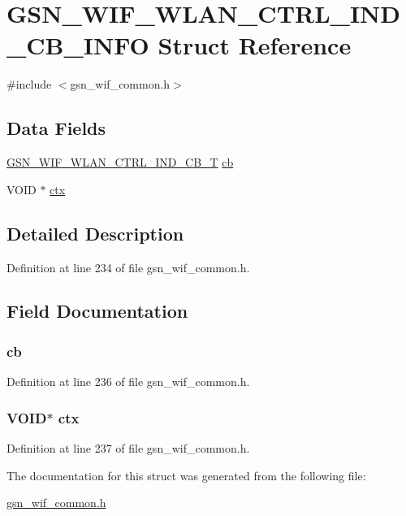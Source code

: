 \hypertarget{a00378}{
\section{GSN\_\-WIF\_\-WLAN\_\-CTRL\_\-IND\_\-CB\_\-INFO Struct Reference}
\label{a00378}
}


{\ttfamily \#include $<$gsn\_\-wif\_\-common.h$>$}

\subsection*{Data Fields}
\begin{DoxyCompactItemize}
\item 
\hyperlink{a00635_ga1a6c66e709c29a827dc0c07e40f4b9aa}{GSN\_\-WIF\_\-WLAN\_\-CTRL\_\-IND\_\-CB\_\-T} \hyperlink{a00378_ae319499210926a8e53a44e6533983eba}{cb}
\item 
VOID $\ast$ \hyperlink{a00378_add401254b29adaa41706c97d1c8d3e89}{ctx}
\end{DoxyCompactItemize}


\subsection{Detailed Description}


Definition at line 234 of file gsn\_\-wif\_\-common.h.



\subsection{Field Documentation}
\hypertarget{a00378_ae319499210926a8e53a44e6533983eba}{
\subsubsection[{cb}]{ {\bf cb}}}
\label{a00378_ae319499210926a8e53a44e6533983eba}


Definition at line 236 of file gsn\_\-wif\_\-common.h.

\hypertarget{a00378_add401254b29adaa41706c97d1c8d3e89}{
\subsubsection[{ctx}]{\setlength{\rightskip}{0pt plus 5cm}VOID$\ast$ {\bf ctx}}}
\label{a00378_add401254b29adaa41706c97d1c8d3e89}


Definition at line 237 of file gsn\_\-wif\_\-common.h.



The documentation for this struct was generated from the following file:\begin{DoxyCompactItemize}
\item 
\hyperlink{a00608}{gsn\_\-wif\_\-common.h}\end{DoxyCompactItemize}
